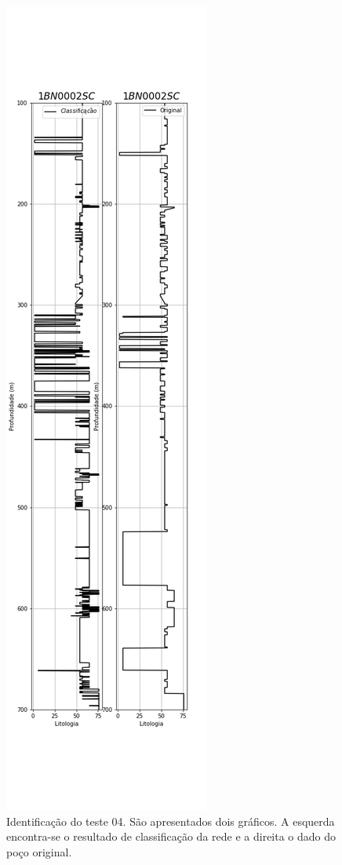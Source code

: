 \begin{figure}[H]
	\centering
	\includegraphics[scale=0.4]{Imagens/result04.png}
	\caption{Identificação do teste 04. São apresentados dois gráficos. A esquerda encontra-se o resultado de classificação da rede e a direita o dado do poço original.}
	\label{IDt04}
\end{figure} 

